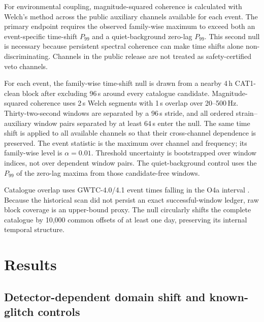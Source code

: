\documentclass[12pt]{article}
\begin{document}
For environmental coupling, magnitude-squared coherence is calculated with
Welch's method \cite{welch1967} across the public auxiliary channels available
for each event.  The primary endpoint requires the observed family-wise maximum
to exceed both an event-specific time-shift $P_{99}$ and a quiet-background
zero-lag $P_{99}$.  This second null is necessary because persistent spectral
coherence can make time shifts alone non-discriminating.  Channels in the
public release are not treated as safety-certified veto channels.

For each event, the family-wise time-shift null is drawn from a nearby 4\,h
CAT1-clean block after excluding 96\,s around every catalogue candidate.
Magnitude-squared coherence uses 2\,s Welch segments with 1\,s overlap over
20--500\,Hz.  Thirty-two-second windows are separated by a 96\,s stride, and
all ordered strain--auxiliary window pairs separated by at least 64\,s enter
the null.  The same time shift is applied to all available channels so that
their cross-channel dependence is preserved.  The event statistic is the
maximum over channel and frequency; its family-wise level is $\alpha=0.01$.
Threshold uncertainty is bootstrapped over window indices, not over dependent
window pairs.  The quiet-background control uses the $P_{99}$ of the zero-lag
maxima from those candidate-free windows.

Catalogue overlap uses GWTC-4.0/4.1 event times falling in the O4a interval
\cite{gwtc4_results,gwtc41_release}.
Because the historical scan did not persist an exact successful-window ledger,
raw block coverage is an upper-bound proxy.  The null circularly shifts the
complete catalogue by 10,000 common offsets of at least one day, preserving
its internal temporal structure.

\section{Results}
\label{sec:results}

\subsection{Detector-dependent domain shift and known-glitch controls}
\label{sec:domain-known}
\end{document}
